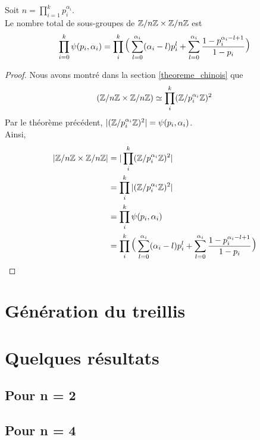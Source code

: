 \documentclass[12pt]{article}
\newcommand{\ZnZ}{\Z/n\Z}
\newcommand{\ZZ}{\ZnZ \x \ZnZ}
\begin{document}
\begin{proposition}
	Soit $n = \prod\limits_{i = 1}^k p_i^{\alpha_i}$.\\
	Le nombre total de sous-groupes de $\ZZ$ est
	$$\prod_{i = 0}^{k} \psi(p_i,\alpha_i)
		= \prod_i^k\mlarge[3](\sum_{l=0}^{\alpha_i}(\alpha_i-l)p_i^l +%
		\sum_{l = 0}^{\alpha_i}\frac{1- p_i^{\alpha_i-l+1}}{1 - p_i}\mlarge[3])$$
\end{proposition}

\begin{proof}
	Nous avons montré dans la section \ref{theoreme_chinois} que
	$$(\ZZ) \isom \prod_i^k(\Z/p_i^{\alpha_i}\Z)^2$$
	Par le théorème précédent, $|(\mathbb Z/p_i^{\alpha_i}\mathbb Z)^2| = \psi(p_i, \alpha_i)$.\\
	Ainsi,
	\begin{equation*}
		\begin{split}
			|\ZZ| &= |\prod_i^k(\Z/p_i^{\alpha_i}\Z)^2|\\
			&= \prod_i^k|(\Z/p_i^{\alpha_i}\Z)^2|\\
			&= \prod_i^k\psi(p_i,\alpha_i)\\
			&= \prod_i^k\mlarge[3](\sum_{l=0}^{\alpha_i}(\alpha_i-l)p_i^l +%
			\sum_{l = 0}^{\alpha_i}\frac{1- p_i^{\alpha_i-l+1}}{1 - p_i}\mlarge[3])
		\end{split}
	\end{equation*}
\end{proof}
\newpage
\section{Génération du treillis}

\newpage
\section{Quelques résultats}
\subsection{Pour n = 2}
\subsection{Pour n = 4}
\end{document}
